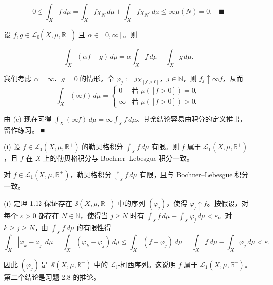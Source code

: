 \begin{remark}
\begin{items}
\begin{subitems}
\[
0 \le \int_X f\,d\mu = \int_X f\chi_N\,d\mu + \int_X f\chi_{N^c}\,d\mu \le \infty\mu(N) = 0 .\quad\blacksquare
\]
\end{subitems}

\item

设 $ f, g \in \mathcal{L}_0(X,\mu,\overline{\mathbb{R}}^+) $ 且 $ \alpha \in [0,\infty] $。则

\[
\int_X (\alpha f + g)\,d\mu = \alpha \int_X f\,d\mu + \int_X g\,d\mu .
\]

\proofhead
我们考虑 $ \alpha = \infty $、$ g = 0 $ 的情形。令 $ \varphi_j := j\chi_{[f>0]} $，$ j \in \mathbb{N} $，则 $ f_j \uparrow \infty f $，从而
\begin{equation*}
\int_X (\infty f)\,d\mu = \begin{cases} 0 & \text{若 } \mu([f > 0]) = 0 , \\ \infty & \text{若 } \mu([f > 0]) > 0 . \end{cases}
\end{equation*}

由 (c) 现在可得 $ \int_X (\infty f)\,d\mu = \infty \int_X f\,d\mu $。其余结论容易由积分的定义推出，留作练习。 \nobreak\hspace{0.35em}■

\item

(i) 设 $ f \in \mathcal{L}_0(X,\mu,\mathbb{R}^+) $ 的勒贝格积分 $ \int_X f\,d\mu $ 有限。则 $ f $ 属于 $ \mathcal{L}_1(X,\mu,\mathbb{R}^+) $，且 $ f $ 在 $ X $ 上的勒贝格积分与 Bochner–Lebesgue 积分一致。

\begin{subitems}
\item

对 $ f \in \mathcal{L}_1(X,\mu,\mathbb{R}^+) $，勒贝格积分 $ \int_X f\,d\mu $ 有限，且与 Bochner–Lebesgue 积分一致。

\proofhead
(i) 定理 1.12 保证存在 $ \mathcal{S}(X,\mu,\mathbb{R}^+) $ 中的序列 $ (\varphi_j) $，使得 $ \varphi_j \uparrow f $。按假设，对每个 $ \varepsilon > 0 $ 都存在 $ N \in \mathbb{N} $，使得当 $ j \ge N $ 时有 $ \int_X f\,d\mu - \int_X \varphi_j\,d\mu < \varepsilon $。对 $ k \ge j \ge N $，由 $ \int_X f\,d\mu $ 的有限性得
\[
\int_X |\varphi_k - \varphi_j|\,d\mu = \int_X (\varphi_k - \varphi_j)\,d\mu \le \int_X (f - \varphi_j)\,d\mu = \int_X f\,d\mu - \int_X \varphi_j\,d\mu < \varepsilon .
\]

因此 $ (\varphi_j) $ 是 $ \mathcal{S}(X,\mu,\mathbb{R}^+) $ 中的 $ \mathcal{L}_1 $-柯西序列。这说明 $ f $ 属于 $ \mathcal{L}_1(X,\mu,\mathbb{R}^+) $。第二个结论是习题 2.8 的推论。


\end{subitems}
\end{items}
\end{remark}
